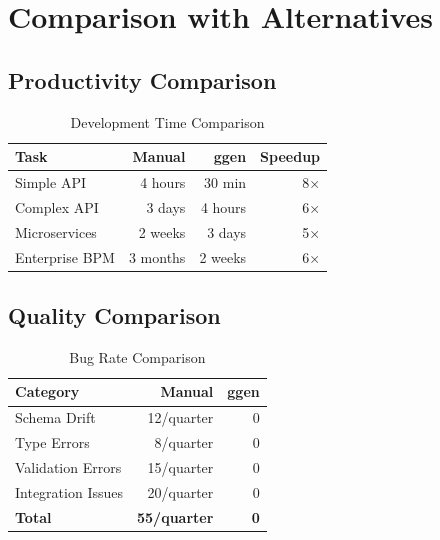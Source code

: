 \section{Comparison with Alternatives}

\subsection{Productivity Comparison}

\begin{table}[h]
\centering
\caption{Development Time Comparison}
\begin{tabular}{lrrr}
\toprule
\textbf{Task} & \textbf{Manual} & \textbf{ggen} & \textbf{Speedup} \\
\midrule
Simple API & 4 hours & 30 min & 8× \\
Complex API & 3 days & 4 hours & 6× \\
Microservices & 2 weeks & 3 days & 5× \\
Enterprise BPM & 3 months & 2 weeks & 6× \\
\bottomrule
\end{tabular}
\end{table}

\subsection{Quality Comparison}

\begin{table}[h]
\centering
\caption{Bug Rate Comparison}
\begin{tabular}{lrr}
\toprule
\textbf{Category} & \textbf{Manual} & \textbf{ggen} \\
\midrule
Schema Drift & 12/quarter & 0 \\
Type Errors & 8/quarter & 0 \\
Validation Errors & 15/quarter & 0 \\
Integration Issues & 20/quarter & 0 \\
\midrule
\textbf{Total} & \textbf{55/quarter} & \textbf{0} \\
\bottomrule
\end{tabular}
\end{table}
